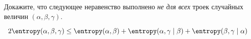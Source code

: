 Докажите, что следующее неравенство выполнено \textit{не для всех} троек случайных величин $(\alpha,
\beta, \gamma)$.

$$
    2 \entropy(\alpha, \beta, \gamma) \le \entropy(\alpha, \beta) + \entropy(\alpha, \gamma \mid \beta) +
    \entropy(\beta, \gamma \mid \alpha)
$$

